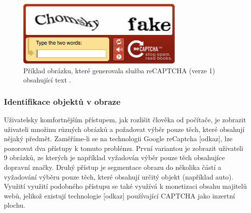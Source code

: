 \documentclass[
  master=true,
  biblatex,
  glossaries,
  index
]{kidiplom}
\begin{document}
\begin{figure}
  \centering
  \includegraphics[scale=0.8]{images/text_image_captcha.jpg}
  \caption{Příklad obrázku, které generovala služba reCAPTCHA (verze 1) obsahující text .}
  \label{fig:captcha_text_image}
\end{figure}


\subsubsection*{Identifikace objektů v obraze}
Uživatelsky komfortnějším přístupem, jak rozlišit člověka od počítače, je zobrazit uživateli množinu různých obrázků a požadovat výběr pouze těch, které obsahují nějaký předmět. Zaměříme-li se na technologii Google reCaptcha [odkaz], lze pozorovat dva přístupy k tomuto problému. První variantou je zobrazit uživateli 9 obrázků, ze kterých je například vyžadován výběr pouze těch obsahujíce dopravní značky. Druhý přístup je segmentace obrazu do několika částí a vyžadování výběru pouze těch, které obsahují určitý objekt (například auto). Využití využití podobného přístupu se také využívá k monetizaci obsahu majitelů webů, jelikož existují technologie [odkaz] používající CAPTCHA jako inzertní plochu. 
\end{document}
